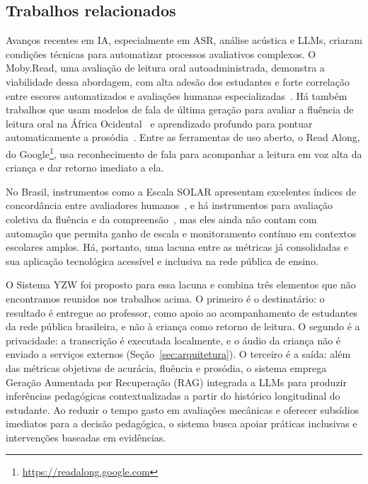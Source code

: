 \documentclass[12pt]{article}
\begin{document}
\subsection{Trabalhos relacionados}
\label{sec:relacionados}
Avanços recentes em IA, especialmente em ASR, análise acústica e LLMs, criaram condições técnicas para automatizar processos avaliativos complexos. O Moby.Read, uma avaliação de leitura oral autoadministrada, demonstra a viabilidade dessa abordagem, com alta adesão dos estudantes e forte correlação entre escores automatizados e avaliações humanas especializadas~\cite{BERNSTEIN2017}. Há também trabalhos que usam modelos de fala de última geração para avaliar a fluência de leitura oral na África Ocidental~\cite{henkel2025supporting} e aprendizado profundo para pontuar automaticamente a prosódia~\cite{wang2024improving}. Entre as ferramentas de uso aberto, o Read Along, do Google\footnote{\url{https://readalong.google.com}}, usa reconhecimento de fala para acompanhar a leitura em voz alta da criança e dar retorno imediato a ela.

No Brasil, instrumentos como a Escala SOLAR apresentam excelentes índices de concordância entre avaliadores humanos~\cite{ALVES2021}, e há instrumentos para avaliação coletiva da fluência e da compreensão~\cite{GENTILINI2020}, mas eles ainda não contam com automação que permita ganho de escala e monitoramento contínuo em contextos escolares amplos. Há, portanto, uma lacuna entre as métricas já consolidadas e sua aplicação tecnológica acessível e inclusiva na rede pública de ensino.

O Sistema YZW foi proposto para essa lacuna e combina três elementos que não encontramos reunidos nos trabalhos acima. O primeiro é o destinatário: o resultado é entregue ao professor, como apoio ao acompanhamento de estudantes da rede pública brasileira, e não à criança como retorno de leitura. O segundo é a privacidade: a transcrição é executada localmente, e o áudio da criança não é enviado a serviços externos (Seção~\ref{sec:arquitetura}). O terceiro é a saída: além das métricas objetivas de acurácia, fluência e prosódia, o sistema emprega Geração Aumentada por Recuperação (RAG) integrada a LLMs para produzir inferências pedagógicas contextualizadas a partir do histórico longitudinal do estudante. Ao reduzir o tempo gasto em avaliações mecânicas e oferecer subsídios imediatos para a decisão pedagógica, o sistema busca apoiar práticas inclusivas e intervenções baseadas em evidências.
\end{document}
